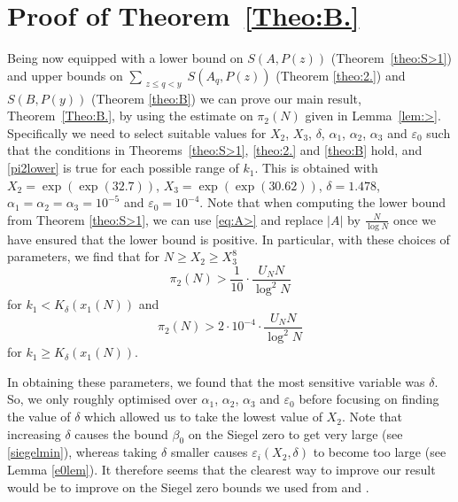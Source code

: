 \documentclass[12pt]{amsart}
\begin{document}
\section{Proof of Theorem~\ref{Theo:B.}}
\label{section:B}
Being now equipped with a lower bound on $S(A,P(z))$ (Theorem~\ref{theo:S>1}) and upper bounds on $\sum_{\substack{z \le q <y}}S(A_q,P(z))$ (Theorem \ref{theo:2.}) and $S(B,P(y))$ (Theorem \ref{theo:B}) we can prove our main result,  Theorem~\ref{Theo:B.}, by using the estimate on $\pi_2(N)$ given in Lemma~\ref{lem:>}. Specifically we need to select suitable values for $X_2$, $X_3$, $\delta$, $\alpha_1$, $\alpha_2$, $\alpha_3$ and $\varepsilon_0$ such that the conditions in Theorems~\ref{theo:S>1}, \ref{theo:2.} and \ref{theo:B} hold, and \eqref{pi2lower} is true for each possible range of $k_1$. This is obtained with $X_2=\exp(\exp(32.7))$, $X_3=\exp(\exp(30.62))$, $\delta=1.478$, $\alpha_1=\alpha_2=\alpha_3=10^{-5}$ and $\varepsilon_0=10^{-4}$. Note that when computing the lower bound from Theorem \ref{theo:S>1}, we can use \eqref{eq:A>} and replace $|A|$ by $\frac{N}{\log N}$ once we have ensured that the lower bound is positive. In particular, with these choices of parameters, we find that for $N\ge X_2\ge X_3^8$
\begin{equation*}
    \pi_2(N)> \frac{1}{10}\cdot\frac{U_N N}{\log^2N}
\end{equation*}
for $k_1<K_{\delta}(x_1(N))$ and
\begin{equation*}
    \pi_2(N)> 2\cdot 10^{-4}\cdot\frac{U_N N}{\log^2N}
\end{equation*}
for $k_1\ge K_{\delta}(x_1(N))$. 

In obtaining these parameters, we found that the most sensitive variable was $\delta$. So, we only roughly optimised over $\alpha_1$, $\alpha_2$, $\alpha_3$ and $\varepsilon_0$ before focusing on finding the value of $\delta$ which allowed us to take the lowest value of $X_2$. Note that increasing $\delta$ causes the bound $\beta_0$ on the Siegel zero to get very large (see \eqref{siegelmin}), whereas taking $\delta$ smaller causes $\varepsilon_i(X_2,\delta)$ to become too large (see Lemma \eqref{e0lem}). It therefore seems that the clearest way to improve our result would be to improve on the Siegel zero bounds we used from \cite{Bordignon1} and \cite{Bordignon2}.
\end{document}
